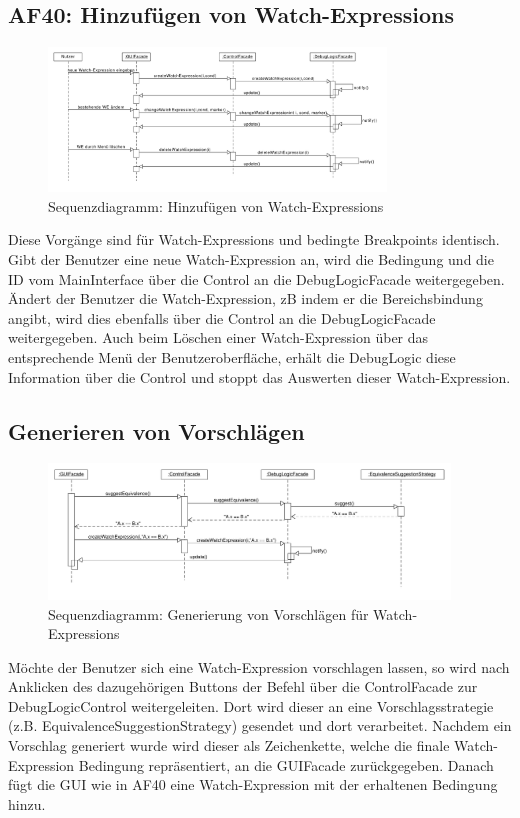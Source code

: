 \documentclass[parskip=full]{scrartcl}
\begin{document}
\subsection{AF40: Hinzufügen von Watch-Expressions}
\begin{figure}[!h]
\centering
\includegraphics[width=0.8\textwidth]{diagrammIdeenUmlet/SequenceDiagrams/seq_WatchExpressionsPDF.pdf}
\caption{Sequenzdiagramm: Hinzufügen von Watch-Expressions}
\end{figure}
Diese Vorgänge sind für Watch-Expressions und bedingte Breakpoints identisch. \\
Gibt der Benutzer eine neue Watch-Expression an, wird die Bedingung und die ID vom MainInterface über 
die Control an die DebugLogicFacade weitergegeben. Ändert der Benutzer die Watch-Expression, zB indem 
er die Bereichsbindung angibt, wird dies ebenfalls über die Control an die DebugLogicFacade weitergegeben.
Auch beim Löschen einer Watch-Expression über das entsprechende Menü der Benutzeroberfläche, erhält die
DebugLogic diese Information über die Control und stoppt das Auswerten dieser Watch-Expression.

\newpage
\subsection{Generieren von Vorschlägen}%
\begin{figure}[!h]
\centering
\includegraphics[width=0.95\textwidth]{diagrammIdeenUmlet/SequenceDiagrams/seq_suggestions.pdf}
\caption{Sequenzdiagramm: Generierung von Vorschlägen für Watch-Expressions}
\end{figure}
Möchte der Benutzer sich eine Watch-Expression vorschlagen lassen, so wird nach Anklicken des dazugehörigen Buttons der Befehl über die ControlFacade zur DebugLogicControl weitergeleiten. Dort wird dieser an eine Vorschlagsstrategie (z.B. EquivalenceSuggestionStrategy) gesendet und dort verarbeitet. Nachdem ein Vorschlag generiert wurde wird dieser als Zeichenkette, welche die finale Watch-Expression Bedingung repräsentiert, an die GUIFacade zurückgegeben. Danach fügt die GUI wie in AF40 eine Watch-Expression mit der erhaltenen Bedingung hinzu.
\end{document}

